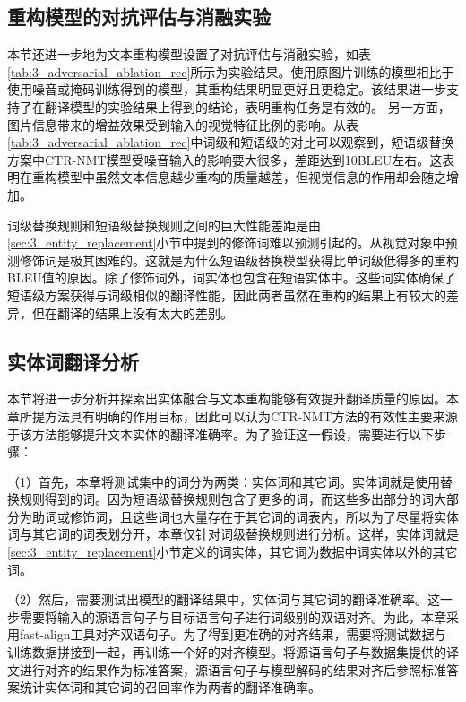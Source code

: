 \subsection{重构模型的对抗评估与消融实验}
\label{sec:3_adversarial_ablation_rec}


本节还进一步地为文本重构模型设置了对抗评估与消融实验，如表\ref{tab:3_adversarial_ablation_rec}所示为实验结果。使用原图片训练的模型相比于使用噪音或掩码训练得到的模型，其重构结果明显更好且更稳定。该结果进一步支持了在翻译模型的实验结果上得到的结论，表明重构任务是有效的。 另一方面，图片信息带来的增益效果受到输入的视觉特征比例的影响。从表\ref{tab:3_adversarial_ablation_rec}中词级和短语级的对比可以观察到，短语级替换方案中CTR-NMT模型受噪音输入的影响要大很多，差距达到10BLEU左右。这表明在重构模型中虽然文本信息越少重构的质量越差，但视觉信息的作用却会随之增加。

词级替换规则和短语级替换规则之间的巨大性能差距是由\ref{sec:3_entity_replacement}小节中提到的修饰词难以预测引起的。从视觉对象中预测修饰词是极其困难的。这就是为什么短语级替换模型获得比单词级低得多的重构BLEU值的原因。除了修饰词外，词实体也包含在短语实体中。这些词实体确保了短语级方案获得与词级相似的翻译性能，因此两者虽然在重构的结果上有较大的差异，但在翻译的结果上没有太大的差别。

\subsection{实体词翻译分析}
\label{sec:3_entity_analysis}
本节将进一步分析并探索出实体融合与文本重构能够有效提升翻译质量的原因。本章所提方法具有明确的作用目标，因此可以认为CTR-NMT方法的有效性主要来源于该方法能够提升文本实体的翻译准确率。为了验证这一假设，需要进行以下步骤：

（1）首先，本章将测试集中的词分为两类：实体词和其它词。实体词就是使用替换规则得到的词。因为短语级替换规则包含了更多的词，而这些多出部分的词大部分为助词或修饰词，且这些词也大量存在于其它词的词表内，所以为了尽量将实体词与其它词的词表划分开，本章仅针对词级替换规则进行分析。这样，实体词就是\ref{sec:3_entity_replacement}小节定义的词实体，其它词为数据中词实体以外的其它词。

（2）然后，需要测试出模型的翻译结果中，实体词与其它词的翻译准确率。这一步需要将输入的源语言句子与目标语言句子进行词级别的双语对齐。为此，本章采用fast-align工具对齐双语句子。为了得到更准确的对齐结果，需要将测试数据与训练数据拼接到一起，再训练一个好的对齐模型。将源语言句子与数据集提供的译文进行对齐的结果作为标准答案，源语言句子与模型解码的结果对齐后参照标准答案统计实体词和其它词的召回率作为两者的翻译准确率。

